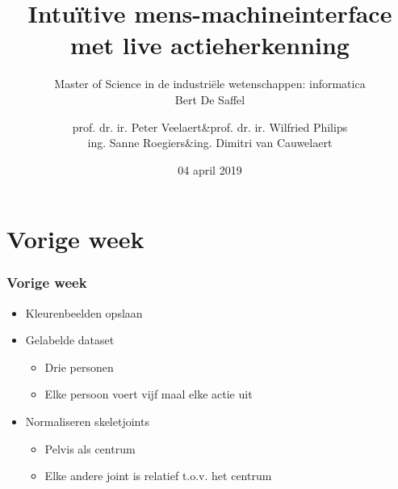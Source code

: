 \documentclass[]{beamer}
\begin{document}
	\title[Actieherkenning met de Kinect sensor]{Intuïtive mens-machineinterface met live actieherkenning }
	\author[Bert De Saffel]{
				\begin{tabular}{rcr}
				prof. dr. ir. Peter Veelaert &\&& prof. dr. ir. Wilfried Philips \\
				ing. Sanne Roegiers &\&& ing. Dimitri van Cauwelaert
				\end{tabular}
	}
	
	\subtitle{Master of Science in de industriële wetenschappen: informatica \\ \vspace{0.2cm} Bert De Saffel}
	\date{04 april 2019}
	\frame{\titlepage}
	
	\section{Vorige week}
	\frametitle{Vorige week}
	\begin{frame}
		\begin{itemize}
			\item Kleurenbeelden opslaan
			\item Gelabelde dataset
			\begin{itemize}
				\item Drie personen
				\item Elke persoon voert vijf maal elke actie uit
			\end{itemize}
			\item Normaliseren skeletjoints
			\begin{itemize}
				\item Pelvis als centrum
				\item Elke andere joint is relatief t.o.v. het centrum 
			\end{itemize}
		\end{itemize}
	\end{frame}
	
\end{document}

